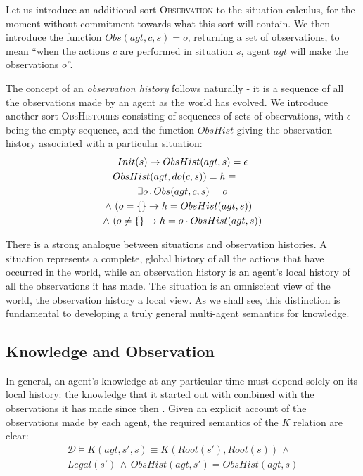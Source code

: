 \documentclass{ifaamas-submission}
\newcommand{\noun}[1]{\textsc{#1}}
\begin{document}
Let us introduce an additional sort \noun{Observation}
to the situation calculus, for the moment without
commitment towards what this sort will contain. We
then introduce the function $Obs(agt,c,s)=o$, returning
a set of observations, to mean {}``when the actions $c$ are performed
in situation $s$, agent $agt$ will make the observations $o$''.

The concept of an \emph{observation history} follows naturally - it
is a sequence of all the observations made by an agent as the world
has evolved. We introduce another sort \noun{ObsHistories} consisting
of sequences of sets of observations, with $\epsilon$ being the empty
sequence, and the function $ObsHist$ giving the observation history
associated with a particular situation:\begin{multline}
Init(s)\rightarrow ObsHist(agt,s)=\epsilon\\
\shoveleft{ObsHist(agt,do(c,s))=h\equiv}\\
\exists o\,.\, Obs(agt,c,s)=o\\
\shoveright{\wedge\,\left(o=\{\}\rightarrow h=ObsHist(agt,s)\right)}\\
\wedge\,\left(o\neq\{\}\rightarrow h=o\cdot ObsHist(agt,s)\right)\label{eqn:obshist_defn}\end{multline}

There is a strong analogue between situations and observation histories.
A situation represents a complete, global history of all the actions
that have occurred in the world, while an observation history is an
agent's local history of all the observations it has made. The situation
is an omniscient view of the world, the observation history a local
view. As we shall see, this distinction is fundamental to developing
a truly general multi-agent semantics for knowledge.


\subsection{Knowledge and Observation}

In general, an agent's knowledge at any particular time must depend
solely on its local history: the knowledge that it started out with
combined with the observations it has made since then \cite{halpern90knowledge_distrib}.
Given an explicit account of the observations made by each agent,
the required semantics of the $K$ relation are clear:
\begin{multline*}
\mathcal{D}\models K(agt,s',s)\equiv K(Root(s'),Root(s))\,\wedge\\
Legal(s')\,\wedge\, ObsHist(agt,s')=ObsHist(agt,s)\end{multline*}
\end{document}
